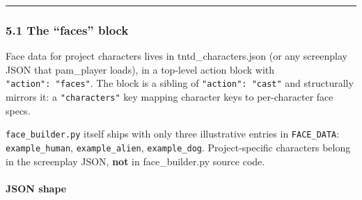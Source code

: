 \documentclass[
  12pt,
  letterpaper,
]{book}
\begin{document}
\begin{center}\rule{0.5\linewidth}{0.5pt}\end{center}

\subsubsection{5.1 The ``faces'' block}\label{the-faces-block}

Face data for project characters lives in tntd\_characters.json (or any
screenplay JSON that pam\_player loads), in a top-level action block
with \texttt{"action":\ "faces"}. The block is a sibling of
\texttt{"action":\ "cast"} and structurally mirrors it: a
\texttt{"characters"} key mapping character keys to per-character face
specs.

\texttt{face\_builder.py} itself ships with only three illustrative
entries in \texttt{FACE\_DATA}: \texttt{example\_human},
\texttt{example\_alien}, \texttt{example\_dog}. Project-specific
characters belong in the screenplay JSON, \textbf{not} in
face\_builder.py source code.

\paragraph{JSON shape}\label{json-shape}
\end{document}
